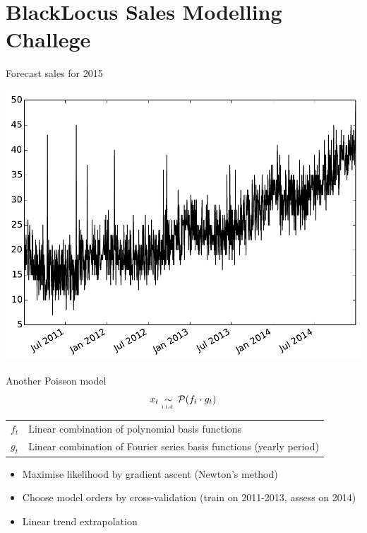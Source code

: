 \documentclass{beamer}
\begin{document}
\section{BlackLocus Sales Modelling Challege}

\begin{frame}{Forecast sales for 2015}
 \begin{center}
  \includegraphics[width=0.8\columnwidth]{sales.pdf}
 \end{center}
\end{frame}

\begin{frame}{Another Poisson model}
 \begin{equation}
  x_{t} \underset{\text{\tiny i.i.d.}}{\sim} \mathcal{P}(f_t \cdot g_t)
 \end{equation}
 
 \begin{tabular}{ll}
  $f_t$ & Linear combination of polynomial basis functions \\
  $g_t$ & Linear combination of Fourier series basis functions (yearly period)
 \end{tabular}
 
 \begin{itemize}
  \item Maximise likelihood by gradient ascent (Newton's method)
  \item Choose model orders by cross-validation (train on 2011-2013, assess on 2014)
  \item Linear trend extrapolation
 \end{itemize}
\end{frame}
\end{document}
